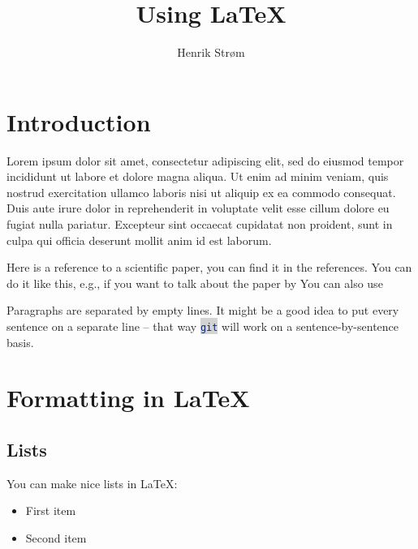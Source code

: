 \documentclass[a4paper, twocolumn]{article}
\author{Henrik Strøm}
\title{Using \LaTeX}
\newcommand{\inlinecode}[2]{\colorbox{lightgray}{\lstinline[language=#1]$#2$}}
\begin{document}


\section{Introduction\label{sec:Introduction}}

Lorem ipsum dolor sit amet, consectetur adipiscing elit, sed do eiusmod tempor incididunt ut labore et dolore magna aliqua. Ut enim ad minim veniam, quis nostrud exercitation ullamco laboris nisi ut aliquip ex ea commodo consequat. Duis aute irure dolor in reprehenderit in voluptate velit esse cillum dolore eu fugiat nulla pariatur. Excepteur sint occaecat cupidatat non proident, sunt in culpa qui officia deserunt mollit anim id est laborum.

Here is a reference to a scientific paper, you can find it in the references.
\cite{lecun1995convolutional}
You can do it like this, e.g., if you want to talk about the paper by
\textcite{lecun1995convolutional}
You can also use
\parencite{lecun1995convolutional}


Paragraphs are separated by empty lines.
It might be a good idea to put every sentence on a separate line -- that way \inlinecode{bash}{git} will work on a sentence-by-sentence basis.

\section{Formatting in \LaTeX\label{sec:Formatting in Latex}}


\subsection{Lists}
\label{sec:Lists}

You can make nice lists in \LaTeX:

\begin{itemize}
    \item First item
    \item Second item
\end{itemize}
\end{document}
